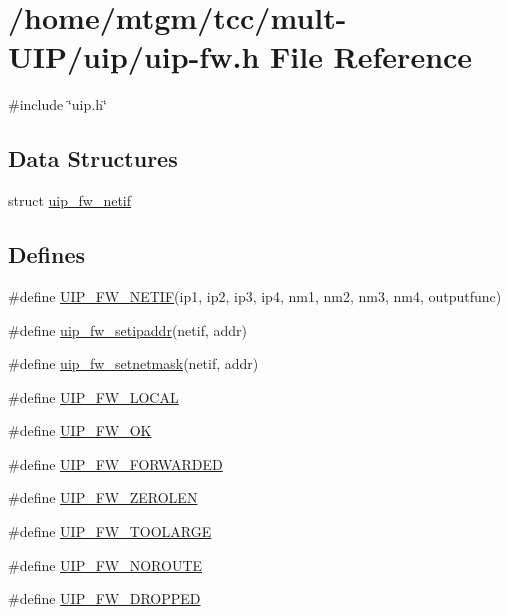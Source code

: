 \hypertarget{uip-fw_8h}{
\section{/home/mtgm/tcc/mult-\/UIP/uip/uip-\/fw.h File Reference}
\label{uip-fw_8h}
}
{\ttfamily \#include \char`\"{}uip.h\char`\"{}}\par
\subsection*{Data Structures}
\begin{DoxyCompactItemize}
\item 
struct \hyperlink{structuip__fw__netif}{uip\_\-fw\_\-netif}
\end{DoxyCompactItemize}
\subsection*{Defines}
\begin{DoxyCompactItemize}
\item 
\#define \hyperlink{group__uipfw_ga6bdb97e217db4401d4433eb330293eaf}{UIP\_\-FW\_\-NETIF}(ip1, ip2, ip3, ip4, nm1, nm2, nm3, nm4, outputfunc)
\item 
\#define \hyperlink{group__uipfw_ga7acf2b0aff9ebcfb2f94dc6471055ca2}{uip\_\-fw\_\-setipaddr}(netif, addr)
\item 
\#define \hyperlink{group__uipfw_gadb02b40bfdb470acb6268ac71e22fc04}{uip\_\-fw\_\-setnetmask}(netif, addr)
\item 
\#define \hyperlink{group__uipfw_ga6836699b9dc9e93034c65b748fc1a9d3}{UIP\_\-FW\_\-LOCAL}
\item 
\#define \hyperlink{group__uipfw_gab3604366e1ccf7ac576e2a72845e0b7f}{UIP\_\-FW\_\-OK}
\item 
\#define \hyperlink{group__uipfw_ga01295e0a76eba8c53265da4264eee50d}{UIP\_\-FW\_\-FORWARDED}
\item 
\#define \hyperlink{group__uipfw_ga29ad276632f8b0a2e41700833d40cb4c}{UIP\_\-FW\_\-ZEROLEN}
\item 
\#define \hyperlink{group__uipfw_gaa98780b025dbb97d09b87c40c92d9e4c}{UIP\_\-FW\_\-TOOLARGE}
\item 
\#define \hyperlink{group__uipfw_ga6d2241b2ed1042167043cf4c63ae52b2}{UIP\_\-FW\_\-NOROUTE}
\item 
\#define \hyperlink{group__uipfw_ga5f290389f83e6c58d9e1d037bf284626}{UIP\_\-FW\_\-DROPPED}
\end{DoxyCompactItemize}

